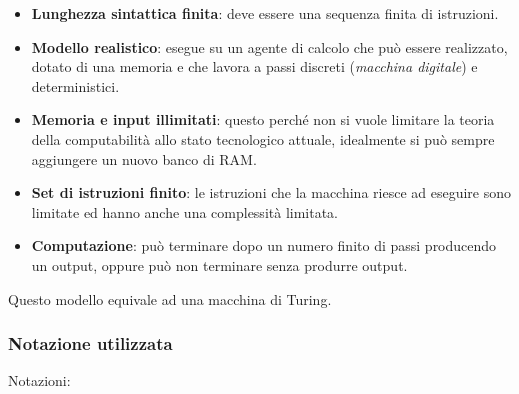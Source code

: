 \begin{itemize}
\item
  \textbf{Lunghezza sintattica finita}: deve essere una sequenza finita
  di istruzioni.
\item
  \textbf{Modello realistico}: esegue su un agente di calcolo che può
  essere realizzato, dotato di una memoria e che lavora a passi discreti
  (\emph{macchina digitale}) e deterministici.
\item
  \textbf{Memoria e input illimitati}: questo perché non si vuole
  limitare la teoria della computabilità allo stato tecnologico attuale,
  idealmente si può sempre aggiungere un nuovo banco di RAM.
\item
  \textbf{Set di istruzioni finito}: le istruzioni che la macchina
  riesce ad eseguire sono limitate ed hanno anche una complessità
  limitata.
\item
  \textbf{Computazione}: può terminare dopo un numero finito di passi
  producendo un output, oppure può non terminare senza produrre output.
\end{itemize}

Questo modello equivale ad una macchina di Turing.

\subsubsection{Notazione utilizzata}\label{notazione-utilizzata}

Notazioni:

